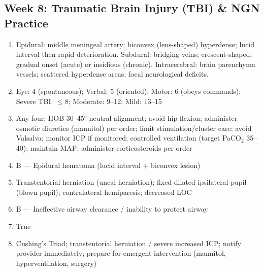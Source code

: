 \documentclass[11pt,letterpaper]{article}
\begin{document}
\begin{keybox}
\subsection*{Week 8: Traumatic Brain Injury (TBI) \& NGN Practice}
\begin{enumerate}[leftmargin=1.5em,label=\textbf{\arabic*.},start=81]
  \item Epidural: middle meningeal artery; biconvex (lens-shaped) hyperdense; lucid interval then rapid deterioration.
        Subdural: bridging veins; crescent-shaped; gradual onset (acute) or insidious (chronic).
        Intracerebral: brain parenchyma vessels; scattered hyperdense areas; focal neurological deficits.
  \item Eye: 4 (spontaneous); Verbal: 5 (oriented); Motor: 6 (obeys commands); Severe TBI: $\leq$8; Moderate: 9--12; Mild: 13--15
  \item Any four: HOB 30--45° neutral alignment; avoid hip flexion; administer osmotic diuretics (mannitol) per order; limit stimulation/cluster care; avoid Valsalva; monitor ICP if monitored; controlled ventilation (target PaCO$_2$ 35--40); maintain MAP; administer corticosteroids per order
  \item B --- Epidural hematoma (lucid interval + biconvex lesion)
  \item Transtentorial herniation (uncal herniation); fixed dilated ipsilateral pupil (blown pupil); contralateral hemiparesis; decreased LOC
  \item B --- Ineffective airway clearance / inability to protect airway
  \item True
  \item Cushing's Triad; transtentorial herniation / severe increased ICP; notify provider immediately; prepare for emergent intervention (mannitol, hyperventilation, surgery)
\end{enumerate}

\hrulefill

\end{keybox}
\end{document}
